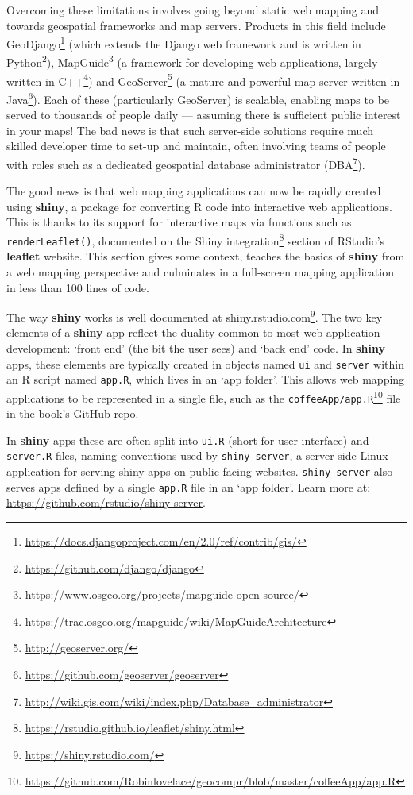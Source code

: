\documentclass[]{krantz}
\let\rmarkdownfootnote\footnote%
\def\footnote{\protect\rmarkdownfootnote}
\renewcommand{\href}[2]{#2\footnote{\url{#1}}}
\let\BeginKnitrBlock\begin \let\EndKnitrBlock\end
\begin{document}
Overcoming these limitations involves going beyond static web mapping and towards geospatial frameworks and map servers.
Products in this field include \href{https://docs.djangoproject.com/en/2.0/ref/contrib/gis/}{GeoDjango} (which extends the Django web framework and is written in \href{https://github.com/django/django}{Python}), \href{https://www.osgeo.org/projects/mapguide-open-source/}{MapGuide} (a framework for developing web applications, largely written in \href{https://trac.osgeo.org/mapguide/wiki/MapGuideArchitecture}{C++}) and \href{http://geoserver.org/}{GeoServer} (a mature and powerful map server written in \href{https://github.com/geoserver/geoserver}{Java}).
Each of these (particularly GeoServer) is scalable, enabling maps to be served to thousands of people daily --- assuming there is sufficient public interest in your maps!
The bad news is that such server-side solutions require much skilled developer time to set-up and maintain, often involving teams of people with roles such as a dedicated geospatial database administrator (\href{http://wiki.gis.com/wiki/index.php/Database_administrator}{DBA}).

The good news is that web mapping applications can now be rapidly created using \textbf{shiny}, a package for converting R code into interactive web applications.
This is thanks to its support for interactive maps via functions such as \texttt{renderLeaflet()}, documented on the \href{https://rstudio.github.io/leaflet/shiny.html}{Shiny integration} section of RStudio's \textbf{leaflet} website.
This section gives some context, teaches the basics of \textbf{shiny} from a web mapping perspective and culminates in a full-screen mapping application in less than 100 lines of code.

The way \textbf{shiny} works is well documented at \href{https://shiny.rstudio.com/}{shiny.rstudio.com}.
The two key elements of a \textbf{shiny} app reflect the duality common to most web application development: `front end' (the bit the user sees) and `back end' code.
In \textbf{shiny} apps, these elements are typically created in objects named \texttt{ui} and \texttt{server} within an R script named \texttt{app.R}, which lives in an `app folder'.
This allows web mapping applications to be represented in a single file, such as the \href{https://github.com/Robinlovelace/geocompr/blob/master/coffeeApp/app.R}{\texttt{coffeeApp/app.R}} file in the book's GitHub repo.

\BeginKnitrBlock{rmdnote}
In \textbf{shiny} apps these are often split into \texttt{ui.R} (short for user interface) and \texttt{server.R} files, naming conventions used by \texttt{shiny-server}, a server-side Linux application for serving shiny apps on public-facing websites.
\texttt{shiny-server} also serves apps defined by a single \texttt{app.R} file in an `app folder'.
Learn more at: \url{https://github.com/rstudio/shiny-server}.
\EndKnitrBlock{rmdnote}
\end{document}
